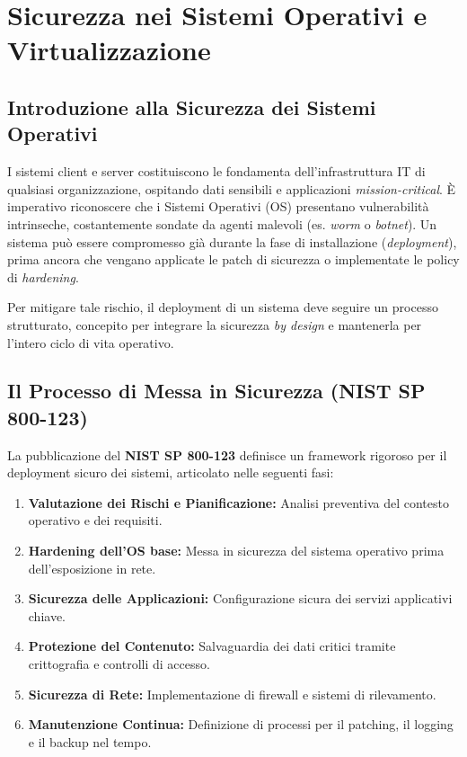 \chapter{Sicurezza nei Sistemi Operativi e Virtualizzazione}

\section{Introduzione alla Sicurezza dei Sistemi Operativi}
I sistemi client e server costituiscono le fondamenta dell'infrastruttura IT di qualsiasi organizzazione, ospitando dati sensibili e applicazioni \textit{mission-critical}. È imperativo riconoscere che i Sistemi Operativi (OS) presentano vulnerabilità intrinseche, costantemente sondate da agenti malevoli (es. \textit{worm} o \textit{botnet}). Un sistema può essere compromesso già durante la fase di installazione (\textit{deployment}), prima ancora che vengano applicate le patch di sicurezza o implementate le policy di \textit{hardening}.

Per mitigare tale rischio, il deployment di un sistema deve seguire un processo strutturato, concepito per integrare la sicurezza \textit{by design} e mantenerla per l'intero ciclo di vita operativo.

\section{Il Processo di Messa in Sicurezza (NIST SP 800-123)}
La pubblicazione del \textbf{NIST SP 800-123} definisce un framework rigoroso per il deployment sicuro dei sistemi, articolato nelle seguenti fasi:
\begin{enumerate}
    \item \textbf{Valutazione dei Rischi e Pianificazione:} Analisi preventiva del contesto operativo e dei requisiti.
    \item \textbf{Hardening dell'OS base:} Messa in sicurezza del sistema operativo prima dell'esposizione in rete.
    \item \textbf{Sicurezza delle Applicazioni:} Configurazione sicura dei servizi applicativi chiave.
    \item \textbf{Protezione del Contenuto:} Salvaguardia dei dati critici tramite crittografia e controlli di accesso.
    \item \textbf{Sicurezza di Rete:} Implementazione di firewall e sistemi di rilevamento.
    \item \textbf{Manutenzione Continua:} Definizione di processi per il patching, il logging e il backup nel tempo.
\end{enumerate}

